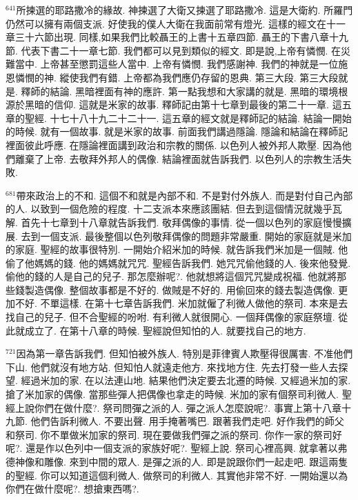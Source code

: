 \documentclass{book}
\begin{document}
$^{641}$所揀選的耶路撒冷的緣故.
神揀選了大衛又揀選了耶路撒冷.
這是大衛約.
所羅門仍然可以擁有兩個支派.
好使我的僕人大衛在我面前常有燈光.
這樣的經文在十一章三十六節出現.
同樣,如果我們比較聶王的上書十五章四節.
聶王的下書八章十九節.
代表下書二十一章七節.
我們都可以見到類似的經文.
即是說,上帝有憐憫.
在災難當中.
上帝甚至懲罰這些人當中.
上帝有憐憫.
我們感謝神.
我們的神就是一位施恩憐憫的神.
縱使我們有錯.
上帝都為我們應仍存留的恩典.
第三大段.
第三大段就是.
釋師的結論.
黑暗裡面有神的應許.
第一點我想和大家講的就是.
黑暗的環境根源於黑暗的信仰.
這就是米家的故事.
釋師記由第十七章到最後的第二十一章.
這五章的聖經.
十七十八十九二十二十一.
這五章的經文就是釋師記的結論.
結論一開始的時候.
就有一個故事.
就是米家的故事.
前面我們講過隱論.
隱論和結論在釋師記裡面彼此呼應.
在隱論裡面講到政治和宗教的關係.
以色列人被外邦人欺壓.
因為他們離棄了上帝.
去敬拜外邦人的偶像.
結論裡面就告訴我們.
以色列人的宗教生活失敗.

$^{681}$帶來政治上的不和.
這個不和就是內部不和.
不是對付外族人.
而是對付自己內部的人.
以致到一個危險的程度.
十二支派本來應該團結.
但去到這個情況就幾乎瓦解.
首先十七章到十八章就告訴我們.
敬拜偶像的事情.
從一個以色列的家庭慢慢擴展.
去到一個支派.
最後整個以色列敬拜偶像的問題非常嚴重.
開始的家庭就是米加的家庭.
聖經的故事很特別.
一開始介紹米加的時候.
就告訴我們米加是一個賊.
他偷了他媽媽的錢.
他的媽媽就咒咒.
聖經告訴我們.
她咒咒偷他錢的人.
後來他發覺.
偷他的錢的人是自己的兒子.
那怎麼辦呢?.
他就想將這個咒咒變成祝福.
他就將那些錢製造偶像.
整個故事都是不好的.
做賊是不好的.
用偷回來的錢去製造偶像.
更加不好.
不單這樣.
在第十七章告訴我們.
米加就僱了利微人做他的祭司.
本來是去找自己的兒子.
但不合聖經的吩咐.
有利微人就很開心.
一個拜偶像的家庭祭壇.
從此就成立了.
在第十八章的時候.
聖經說但知怕的人.
就要找自己的地方.

$^{721}$因為第一章告訴我們.
但知怕被外族人.
特別是菲律賓人欺壓得很厲害.
不准他們下山.
他們就沒有地方站.
但知怕人就遠走他方.
來找地方住.
先去打發一些人去探望.
經過米加的家.
在以法連山地.
結果他們決定要去北遷的時候.
又經過米加的家.
搶了米加家的偶像.
當那些彈人把偶像也拿走的時候.
米加的家有個祭司利微人.
聖經上說你們在做什麼?.
祭司問彈之派的人.
彈之派人怎麼說呢?.
事實上第十八章十九節.
他們告訴利微人.
不要出聲.
用手掩著嘴巴.
跟著我們走吧.
好作我們的師父和祭司.
你不單做米加家的祭司.
現在要做我們彈之派的祭司.
你作一家的祭司好呢?.
還是作以色列中一個支派的家族好呢?.
聖經上說.
祭司心裡高興.
就拿著以弗德神像和雕像.
來到中間的眾人.
是彈之派的人.
即是說跟你們一起走吧.
跟這兩隻的聖經.
你可以知道這個利微人.
做祭司的利微人.
其實他非常不好.
一開始還以為你們在做什麼呢?.
想搶東西嗎?.
\end{document}

